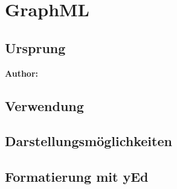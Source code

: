 \chapter{GraphML}
\label{cha:Einleitung}



\section{Ursprung}

\textbf{Author:} 

\section{Verwendung}

\section{Darstellungsmöglichkeiten}

\section{Formatierung mit yEd}



